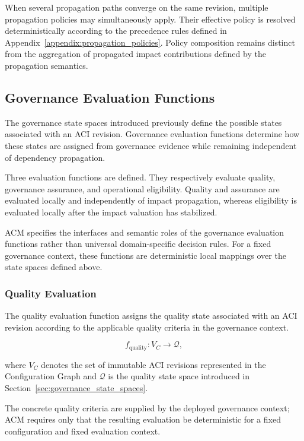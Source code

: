\documentclass[10pt]{article}
\begin{document}
When several propagation paths converge on the same revision, multiple propagation policies may simultaneously apply. Their effective policy is resolved
deterministically according to the precedence rules defined in Appendix~\ref{appendix:propagation_policies}. Policy composition remains distinct
from the aggregation of propagated impact contributions defined by the propagation semantics.

\subsection{Governance Evaluation Functions}
\label{sec:evaluation_functions}

The governance state spaces introduced previously define the possible states associated with an ACI revision. Governance evaluation functions determine how these states are assigned from governance evidence while remaining independent of dependency propagation.

Three evaluation functions are defined. They respectively evaluate quality,
governance assurance, and operational eligibility. Quality and assurance are evaluated locally and independently of impact propagation, whereas eligibility is evaluated locally after the impact valuation has
stabilized.

ACM specifies the interfaces and semantic roles of the governance evaluation functions rather than universal domain-specific decision rules. For a fixed governance context, these functions are deterministic local mappings over the state spaces defined above.

\subsubsection{Quality Evaluation}

The quality evaluation function assigns the quality state associated with an ACI revision according to the applicable quality criteria in the governance context.

\begin{equation}
	f_{\mathrm{quality}} : V_C \rightarrow \mathcal{Q},
	\label{eq:f_quality}
\end{equation}

where $V_C$ denotes the set of immutable ACI revisions represented in the Configuration Graph and $\mathcal{Q}$ is the quality state space introduced in Section~\ref{sec:governance_state_spaces}.

The concrete quality criteria are supplied by the deployed governance context; ACM requires only that the resulting evaluation be deterministic for a fixed configuration and fixed evaluation context.
\end{document}
